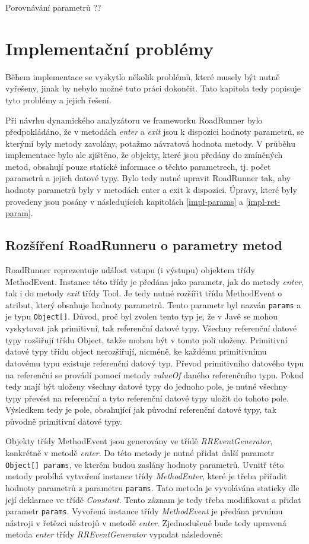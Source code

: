 Porovnávání parametrů ??

\section{Implementační problémy}

Během implementace se vyskytlo několik problémů, které musely být nutně vyřešeny, jinak by nebylo možné tuto práci dokončit. Tato kapitola tedy popisuje tyto problémy a jejich řešení.

Při návrhu dynamického analyzátoru ve frameworku RoadRunner bylo předpokládáno, že v metodách \textit{enter} a \textit{exit} jsou k dispozici hodnoty parametrů, se kterými byly metody zavolány, potažmo návratová hodnota metody. V průběhu implementace bylo ale zjištěno, že objekty, které jsou předány do zmíněných metod, obsahují pouze statické informace o těchto parametrech, tj. počet parametrů a jejich datové typy. Bylo tedy nutné upravit RoadRunner tak, aby hodnoty parametrů byly v metodách enter a exit k dispozici. Úpravy, které byly provedeny jsou posány v následujících kapitolách \ref{impl-params} a \ref{impl-ret-param}. 

\subsection{Rozšíření RoadRunneru o parametry metod}\label{impl-prams}

RoadRunner reprezentuje událost vstupu (i výstupu) objektem třídy MethodEvent. Instance této třídy je předána jako parametr, jak do metody \textit{enter}, tak i do metody \textit{exit} třídy Tool. Je tedy nutné rozšířit třídu MethodEvent o atribut, který obsahuje hodnoty parametrů. Tento parametr byl nazván \texttt{params} a je typu \texttt{Object[]}. Důvod, proč byl zvolen tento typ je, že v Javě se mohou vyskytovat jak primitivní, tak referenční datové typy. Všechny referenční datové typy rozšiřují třídu Object, takže mohou být v tomto poli uloženy. Primitivní datové typy třídu object nerozšiřují, nicméně, ke každému primitivnímu datovému typu existuje referenční datový typ. Převod primitivního datového typu na referenční se provádí pomocí metody \textit{valueOf} daného referenčního typu. Pokud tedy mají být uloženy všechny datové typy do jednoho pole, je nutné všechny typy převést na referenční a tyto referenční datové typy uložit do tohoto pole. Výsledkem tedy je pole, obsahující jak původní referenční datové typy, tak původně primitivní datové typy.

Objekty třídy MethodEvent jsou generovány ve třídě \textit{RREventGenerator}, konkrétně v metodě \textit{enter}. Do této metody je nutné přidat další parametr \texttt{Object[] params}, ve kterém budou zaslány hodnoty parametrů. Uvnitř této metody probíhá vytvoření instance třídy \textit{MethodEnter}, které je třeba přiřadit hodnoty parametrů z parametru \texttt{params}. Tato metoda je vyvolávána staticky dle její deklarace ve třídě \textit{Constant}. Tento záznam je tedy třeba modifikovat a přidat parametr \texttt{params}. Vyvořená instance třídy \textit{MethodEvent} je předána prvnímu nástroji v řetězci nástrojů v metodě \textit{enter}. Zjednodušeně bude tedy upravená metoda \textit{enter} třídy \textit{RREventGenerator} vypadat následovně:

